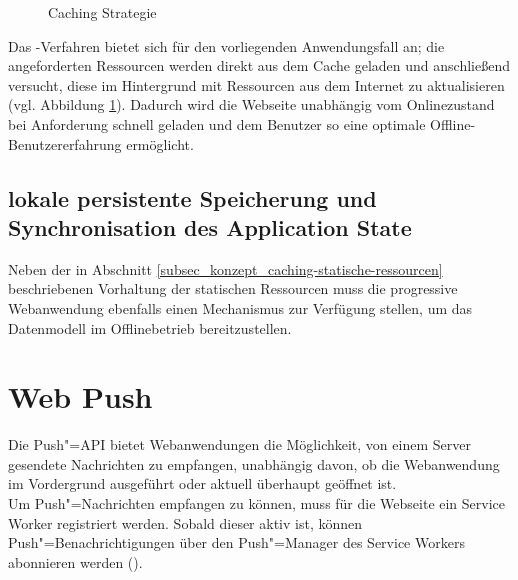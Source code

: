 \begin{figure}[htp] 
\caption{Caching Strategie }
\label{image_konzept_caching-strategie}
\end{figure} 

Das -Verfahren bietet sich für den vorliegenden Anwendungsfall an; die angeforderten Ressourcen werden direkt aus dem Cache geladen und anschließend versucht, diese im Hintergrund mit Ressourcen aus dem Internet zu aktualisieren (vgl. Abbildung \ref{image_konzept_caching-strategie}). Dadurch wird die Webseite unabhängig vom Onlinezustand bei Anforderung schnell geladen und dem Benutzer so eine optimale Offline-Benutzererfahrung ermöglicht.

\subsection{lokale persistente Speicherung und Synchronisation des Application State}
\label{subsec_konzeption_caching-modell}

Neben der in Abschnitt \ref{subsec_konzept_caching-statische-ressourcen} beschriebenen Vorhaltung der statischen Ressourcen muss die progressive Webanwendung ebenfalls einen Mechanismus zur Verfügung stellen, um das Datenmodell im Offlinebetrieb bereitzustellen.



\newpage
\section{Web Push}
\label{subsubsec_konzeption_serviceworker_push-api}

Die Push"=API bietet Webanwendungen die Möglichkeit, von einem Server gesendete Nachrichten zu empfangen, unabhängig davon, ob die Webanwendung im Vordergrund ausgeführt oder aktuell überhaupt geöffnet ist. \\
Um Push"=Nachrichten empfangen zu können, muss für die Webseite ein Service Worker registriert werden. Sobald dieser aktiv ist, können Push"=Benachrichtigungen über den Push"=Manager des Service Workers abonnieren werden ().

